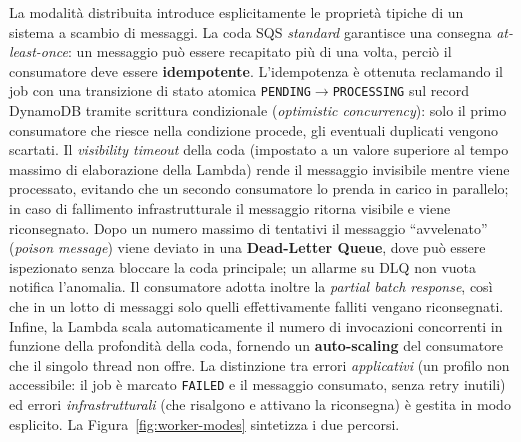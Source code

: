 \documentclass[11pt,a4paper]{article}
\begin{document}
La modalità distribuita introduce esplicitamente le proprietà tipiche di un sistema a
scambio di messaggi. La coda SQS \emph{standard} garantisce una consegna
\emph{at-least-once}: un messaggio può essere recapitato più di una volta, perciò il
consumatore deve essere \textbf{idempotente}. L'idempotenza è ottenuta reclamando il job
con una transizione di stato atomica \texttt{PENDING}$\to$\texttt{PROCESSING} sul record
DynamoDB tramite scrittura condizionale (\emph{optimistic concurrency}): solo il primo
consumatore che riesce nella condizione procede, gli eventuali duplicati vengono
scartati. Il \emph{visibility timeout} della coda (impostato a un valore superiore al
tempo massimo di elaborazione della Lambda) rende il messaggio invisibile mentre viene
processato, evitando che un secondo consumatore lo prenda in carico in parallelo; in
caso di fallimento infrastrutturale il messaggio ritorna visibile e viene riconsegnato.
Dopo un numero massimo di tentativi il messaggio ``avvelenato'' (\emph{poison message})
viene deviato in una \textbf{Dead-Letter Queue}, dove può essere ispezionato senza
bloccare la coda principale; un allarme su DLQ non vuota notifica l'anomalia. Il
consumatore adotta inoltre la \emph{partial batch response}, così che in un lotto di
messaggi solo quelli effettivamente falliti vengano riconsegnati. Infine, la Lambda
scala automaticamente il numero di invocazioni concorrenti in funzione della profondità
della coda, fornendo un \textbf{auto-scaling} del consumatore che il singolo thread non
offre. La distinzione tra errori \emph{applicativi} (un profilo non accessibile: il job è
marcato \texttt{FAILED} e il messaggio consumato, senza retry inutili) ed errori
\emph{infrastrutturali} (che risalgono e attivano la riconsegna) è gestita in modo
esplicito. La Figura~\ref{fig:worker-modes} sintetizza i due percorsi.
\end{document}

